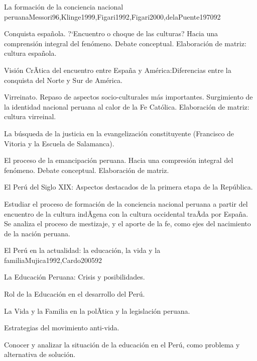\begin{syllabus}
\begin{unit}{La formación de la conciencia nacional peruana}{Messori96,Klinge1999,Figari1992,Figari2000,delaPuente1970}{9}{2}
\begin{topics}
      \item Conquista española. ?`Encuentro o choque de las culturas? Hacia una comprensión integral del fenómeno. Debate conceptual. Elaboración de matriz: cultura española.
      \item Visión CrÃ­tica del encuentro entre España y América:Diferencias entre la conquista del Norte y Sur de América.
      \item Virreinato. Repaso de aspectos socio-culturales más importantes. Surgimiento de la identidad nacional peruana al calor de la Fe Católica. Elaboración de matriz: cultura virreinal.
      \item La búsqueda de la justicia en la evangelización constituyente (Francisco de Vitoria y la Escuela de Salamanca).
      \item El proceso de la emancipación peruana. Hacia una compresión integral del fenómeno. Debate conceptual. Elaboración de matriz.
      \item El Perú del Siglo XIX: Aspectos destacados de la primera etapa de la República.
\end{topics}
\begin{unitgoals}
      \item Estudiar el proceso de formación de la conciencia nacional peruana a partir del encuentro de la cultura indÃ­gena con la cultura occidental traÃ­da por España. Se analiza el proceso de mestizaje, y el aporte de la fe, como ejes del nacimiento de la nación peruana.
\end{unitgoals}
\end{unit}

\begin{unit}{El Perú en la actualidad: la educación, la vida y la familia}{Mujica1992,Cardo2005}{9}{2}
\begin{topics}
      \item La Educación Peruana: Crisis y posibilidades.
      \item Rol de la Educación en el desarrollo del Perú.
      \item La Vida y la Familia en la polÃ­tica y la legislación peruana.
      \item Estrategias del movimiento anti-vida.
\end{topics}
\begin{unitgoals}
      \item Conocer y analizar la situación de la educación en el Perú, como problema y alternativa de solución.
\end{unitgoals}
\end{unit}


\end{syllabus}
